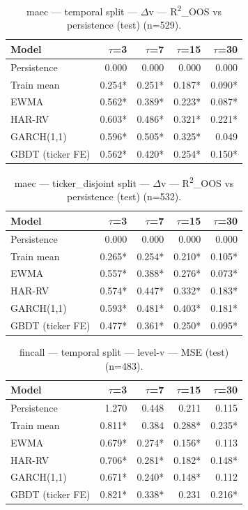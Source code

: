 \begin{table}[t]
\centering
\begin{tabular}{lrrrr}
\toprule
Model & $\tau$=3 & $\tau$=7 & $\tau$=15 & $\tau$=30 \\
\midrule
Persistence & 0.000 & 0.000 & 0.000 & 0.000 \\
Train mean & 0.254* & 0.251* & 0.187* & 0.090* \\
EWMA & 0.562* & 0.389* & 0.223* & 0.087* \\
HAR-RV & 0.603* & 0.486* & 0.321* & 0.221* \\
GARCH(1,1) & 0.596* & 0.505* & 0.325* & 0.049 \\
GBDT (ticker FE) & 0.562* & 0.420* & 0.254* & 0.150* \\
\bottomrule
\end{tabular}
\caption{maec — temporal split — $\Delta$v — R\textsuperscript{2}\_OOS vs persistence (test) (n=529).}
\end{table}

\begin{table}[t]
\centering
\begin{tabular}{lrrrr}
\toprule
Model & $\tau$=3 & $\tau$=7 & $\tau$=15 & $\tau$=30 \\
\midrule
Persistence & 0.000 & 0.000 & 0.000 & 0.000 \\
Train mean & 0.265* & 0.254* & 0.210* & 0.105* \\
EWMA & 0.557* & 0.388* & 0.276* & 0.073* \\
HAR-RV & 0.574* & 0.447* & 0.332* & 0.183* \\
GARCH(1,1) & 0.593* & 0.481* & 0.403* & 0.181* \\
GBDT (ticker FE) & 0.477* & 0.361* & 0.250* & 0.095* \\
\bottomrule
\end{tabular}
\caption{maec — ticker\_disjoint split — $\Delta$v — R\textsuperscript{2}\_OOS vs persistence (test) (n=532).}
\end{table}

\begin{table}[t]
\centering
\begin{tabular}{lrrrr}
\toprule
Model & $\tau$=3 & $\tau$=7 & $\tau$=15 & $\tau$=30 \\
\midrule
Persistence & 1.270 & 0.448 & 0.211 & 0.115 \\
Train mean & 0.811* & 0.384 & 0.288* & 0.235* \\
EWMA & 0.679* & 0.274* & 0.156* & 0.113 \\
HAR-RV & 0.706* & 0.281* & 0.182* & 0.148* \\
GARCH(1,1) & 0.671* & 0.240* & 0.148* & 0.112 \\
GBDT (ticker FE) & 0.821* & 0.338* & 0.231 & 0.216* \\
\bottomrule
\end{tabular}
\caption{fincall — temporal split — level-v — MSE (test) (n=483).}
\end{table}

